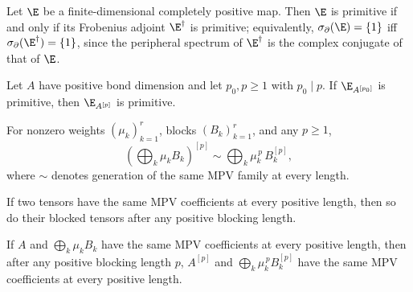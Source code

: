 \begin{lemma}%
    \label{thm:primitive_adjoint_equiv}
    \leanok
    Let $\E$ be a finite-dimensional completely positive map. Then $\E$ is
    primitive if and only if its Frobenius adjoint $\E^\dagger$ is primitive;
    equivalently, $\sigma_\partial(\E) = \{1\}$ iff
    $\sigma_\partial(\E^\dagger) = \{1\}$, since the peripheral spectrum of
    $\E^\dagger$ is the complex conjugate of that of $\E$.
\end{lemma}

\begin{lemma}%
    \label{thm:primitive_blocking_divisible}
    \leanok
    Let $A$ have positive bond dimension and let $p_0,p\ge 1$ with $p_0 \mid p$.
    If $\E_{A^{[p_0]}}$ is primitive, then $\E_{A^{[p]}}$ is primitive.
\end{lemma}

\begin{lemma}%
    \label{thm:block_tensor_to_tensor_from_blocks}
    \leanok
    For nonzero weights $(\mu_k)_{k=1}^r$, blocks $(B_k)_{k=1}^r$, and any
    $p\ge 1$,
    \[
        (\textstyle\bigoplus_k \mu_k B_k)^{[p]}
        \sim  \textstyle\bigoplus_k \mu_k^{\,p}\, B_k^{[p]},
    \]
    where $\sim$ denotes generation of the same MPV family at every length.
\end{lemma}

\begin{lemma}%
    \label{thm:same_mpv2_pos_block_tensor}
    \leanok
    If two tensors have the same MPV coefficients at every positive length, then
    so do their blocked tensors after any positive blocking length.
\end{lemma}

\begin{lemma}%
    \label{thm:same_mpv2_pos_block_tensor_to_tensor_from_blocks}
    \leanok
    If $A$ and $\bigoplus_k \mu_k B_k$ have the same MPV coefficients at every
    positive length, then after any positive blocking length $p$, $A^{[p]}$ and
    $\bigoplus_k \mu_k^{\,p} B_k^{[p]}$ have the same MPV coefficients at every
    positive length.
\end{lemma}

